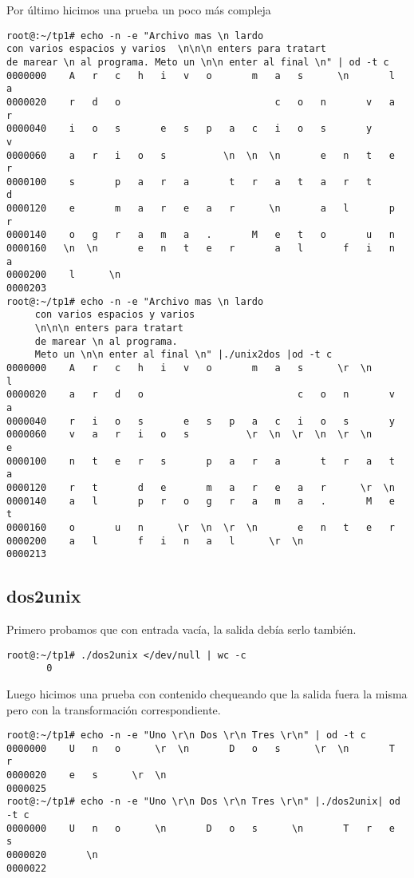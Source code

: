 \documentclass[a4paper,11pt]{article}
\begin{document}
Por \'ultimo hicimos una prueba un poco m\'as compleja
\begin{verbatim}
root@:~/tp1# echo -n -e "Archivo mas \n lardo    
con varios espacios y varios  \n\n\n enters para tratart 
de marear \n al programa. Meto un \n\n enter al final \n" | od -t c
0000000    A   r   c   h   i   v   o       m   a   s      \n       l   a
0000020    r   d   o                           c   o   n       v   a   r
0000040    i   o   s       e   s   p   a   c   i   o   s       y       v
0000060    a   r   i   o   s          \n  \n  \n       e   n   t   e   r
0000100    s       p   a   r   a       t   r   a   t   a   r   t       d
0000120    e       m   a   r   e   a   r      \n       a   l       p   r
0000140    o   g   r   a   m   a   .       M   e   t   o       u   n    
0000160   \n  \n       e   n   t   e   r       a   l       f   i   n   a
0000200    l      \n                                                    
0000203
root@:~/tp1# echo -n -e "Archivo mas \n lardo 
     con varios espacios y varios  
     \n\n\n enters para tratart 
     de marear \n al programa. 
     Meto un \n\n enter al final \n" |./unix2dos |od -t c
0000000    A   r   c   h   i   v   o       m   a   s      \r  \n       l
0000020    a   r   d   o                           c   o   n       v   a
0000040    r   i   o   s       e   s   p   a   c   i   o   s       y    
0000060    v   a   r   i   o   s          \r  \n  \r  \n  \r  \n       e
0000100    n   t   e   r   s       p   a   r   a       t   r   a   t   a
0000120    r   t       d   e       m   a   r   e   a   r      \r  \n    
0000140    a   l       p   r   o   g   r   a   m   a   .       M   e   t
0000160    o       u   n      \r  \n  \r  \n       e   n   t   e   r    
0000200    a   l       f   i   n   a   l      \r  \n                    
0000213
\end{verbatim}

\subsection{dos2unix}
Primero probamos que con entrada vac\'ia, la salida deb\'ia serlo tambi\'en.
\begin{verbatim}
root@:~/tp1# ./dos2unix </dev/null | wc -c
       0
\end{verbatim}

Luego hicimos una prueba con contenido chequeando que la salida fuera la misma pero con la transformaci\'on correspondiente.
\begin{verbatim}
root@:~/tp1# echo -n -e "Uno \r\n Dos \r\n Tres \r\n" | od -t c
0000000    U   n   o      \r  \n       D   o   s      \r  \n       T   r
0000020    e   s      \r  \n                                            
0000025
root@:~/tp1# echo -n -e "Uno \r\n Dos \r\n Tres \r\n" |./dos2unix| od -t c
0000000    U   n   o      \n       D   o   s      \n       T   r   e   s
0000020       \n                                                        
0000022
\end{verbatim}
\end{document}
